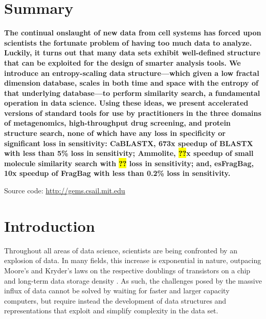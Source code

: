 \documentclass[review,preprint,12pt]{elsarticle}
\renewcommand{\cite}{\citep} %
\theoremstyle{definition}
\theoremstyle{remark}
\numberwithin{equation}{section}
\begin{document}
\section{Summary}
{ \bfseries
    The continual onslaught of new data from cell systems has forced upon scientists the fortunate problem of having too much data to analyze.
    Luckily, it turns out that many data sets exhibit well-defined structure that can be exploited for the design of 
smarter analysis tools.
    We introduce an entropy-scaling data structure---which given a low fractal dimension database, scales in both time and space with the entropy of that underlying database---to perform similarity search, a fundamental operation in data science.
    Using these ideas, we present accelerated versions of standard tools for use by practitioners in the three domains of metagenomics, high-throughput drug screening, and protein structure search, none of which have any loss in specificity or significant loss in sensitivity:
    CaBLASTX, 673x speedup of BLASTX with less than 5\% loss in sensitivity; Ammolite, \hl{??}x speedup of small molecule similarity search with \hl{??} loss in sensitivity; and, esFragBag, 10x speedup of FragBag with less than 0.2\% loss in sensitivity.

    Source code: \url{http://gems.csail.mit.edu}
}

\section{Introduction}
Throughout all areas of data science, scientists are being confronted by an 
explosion of data.
In many fields, this increase is exponential in nature, outpacing Moore's and Kryder's laws on the respective doublings of transistors on a chip and long-term data storage density \cite{kahn2011future}.
As such, the challenges posed by the massive influx of data cannot be solved by waiting for faster and larger capacity computers, but require instead the development of data structures and representations that exploit and simplify complexity in the data set.
\end{document}

